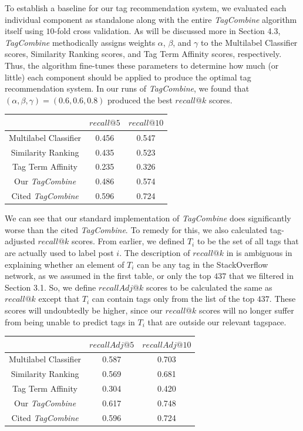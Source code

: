 \documentclass[10pt]{IEEEtran}
\begin{document}
To establish a baseline for our tag recommendation system, we evaluated each individual component as standalone along with the entire \textit{TagCombine} algorithm itself using $10$-fold cross validation. As will be discussed more in Section 4.3, \textit{TagCombine} methodically assigns weights $\alpha$, $\beta$, and $\gamma$ to the Multilabel Classifier scores, Similarity Ranking scores, and Tag Term Affinity scores, respectively. Thus, the algorithm fine-tunes these parameters to determine how much (or little) each component should be applied to produce the optimal tag recommendation system. In our runs of \textit{TagCombine}, we found that $(\alpha, \beta, \gamma) = (0.6, 0.6, 0.8)$ produced the best $recall@k$ scores.
\begin{center}\begin{tabular}{c||c|c}
& $recall@5$ & $recall@10$\\ \hline\hline
Multilabel Classifier & 0.456 & 0.547\\ \hline
Similarity Ranking & 0.435 & 0.523\\ \hline
Tag Term Affinity & 0.235 & 0.326\\ \hline\hline
Our \textit{TagCombine} & 0.486 & 0.574\\ \hline\hline
\cite{1} Cited \textit{TagCombine} & 0.596 & 0.724\\
\end{tabular}\end{center}
We can see that our standard implementation of \textit{TagCombine} does significantly worse than the cited \textit{TagCombine}. To remedy for this, we also calculated tag-adjusted $recall@k$ scores. From earlier, we defined $T_i$ to be the set of all tags that are actually used to label post $i$. The description of $recall@k$ in \cite{1} is ambiguous in explaining whether an element of $T_i$ can be any tag in the StackOverflow network, as we assumed in the first table, or only the top $437$ that we filtered in Section 3.1. So, we define $recallAdj@k$ scores to be calculated the same as $recall@k$ except that $T_i$ can contain tags only from the list of the top $437$. These scores will undoubtedly be higher, since our $recall@k$ scores will no longer suffer from being unable to predict tags in $T_i$ that are outside our relevant tagspace.
\begin{center}\begin{tabular}{c||c|c}
& $recallAdj@5$ & $recallAdj@10$\\ \hline\hline
Multilabel Classifier & 0.587 & 0.703\\ \hline
Similarity Ranking & 0.569 & 0.681\\ \hline
Tag Term Affinity & 0.304 & 0.420\\ \hline\hline
Our \textit{TagCombine} & 0.617 & 0.748\\ \hline\hline
Cited \textit{TagCombine} & 0.596 & 0.724\\
\end{tabular}\end{center}
\end{document}
